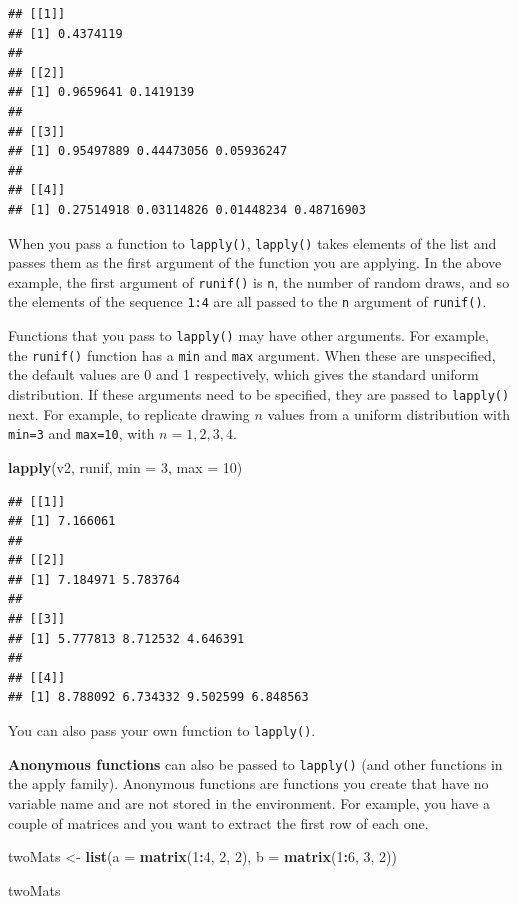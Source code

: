 \documentclass[
]{book}
\newenvironment{Shaded}{\begin{snugshade}}{\end{snugshade}}
\newcommand{\AttributeTok}[1]{\textcolor[rgb]{0.13,0.29,0.53}{#1}}
\newcommand{\DecValTok}[1]{\textcolor[rgb]{0.00,0.00,0.81}{#1}}
\newcommand{\FunctionTok}[1]{\textcolor[rgb]{0.13,0.29,0.53}{\textbf{#1}}}
\newcommand{\NormalTok}[1]{#1}
\newcommand{\OtherTok}[1]{\textcolor[rgb]{0.56,0.35,0.01}{#1}}
\newcommand{\SpecialCharTok}[1]{\textcolor[rgb]{0.81,0.36,0.00}{\textbf{#1}}}
\theoremstyle{definition}
\theoremstyle{definition}
\theoremstyle{definition}
\theoremstyle{definition}
\theoremstyle{remark}
\begin{document}
\begin{verbatim}
## [[1]]
## [1] 0.4374119
## 
## [[2]]
## [1] 0.9659641 0.1419139
## 
## [[3]]
## [1] 0.95497889 0.44473056 0.05936247
## 
## [[4]]
## [1] 0.27514918 0.03114826 0.01448234 0.48716903
\end{verbatim}

When you pass a function to \texttt{lapply()}, \texttt{lapply()} takes elements of the list and passes them as the first argument of the function you are applying. In the above example, the first argument of \texttt{runif()} is \texttt{n}, the number of random draws, and so the elements of the sequence \texttt{1:4} are all passed to the \texttt{n} argument of \texttt{runif()}.

Functions that you pass to \texttt{lapply()} may have other arguments. For example, the \texttt{runif()} function has a \texttt{min} and \texttt{max} argument. When these are unspecified, the default values are 0 and 1 respectively, which gives the standard uniform distribution. If these arguments need to be specified, they are passed to \texttt{lapply()} next. For example, to replicate drawing \(n\) values from a uniform distribution with \texttt{min=3} and \texttt{max=10}, with \(n = 1, 2, 3, 4\).

\begin{Shaded}
\begin{Highlighting}[]
\FunctionTok{lapply}\NormalTok{(v2, runif, }\AttributeTok{min =} \DecValTok{3}\NormalTok{, }\AttributeTok{max =} \DecValTok{10}\NormalTok{)}
\end{Highlighting}
\end{Shaded}

\begin{verbatim}
## [[1]]
## [1] 7.166061
## 
## [[2]]
## [1] 7.184971 5.783764
## 
## [[3]]
## [1] 5.777813 8.712532 4.646391
## 
## [[4]]
## [1] 8.788092 6.734332 9.502599 6.848563
\end{verbatim}

You can also pass your own function to \texttt{lapply()}.

\textbf{Anonymous functions} can also be passed to \texttt{lapply()} (and other functions in the apply family). Anonymous functions are functions you create that have no variable name and are not stored in the environment. For example, you have a couple of matrices and you want to extract the first row of each one.

\begin{Shaded}
\begin{Highlighting}[]
\NormalTok{twoMats }\OtherTok{\textless{}{-}} \FunctionTok{list}\NormalTok{(}\AttributeTok{a =} \FunctionTok{matrix}\NormalTok{(}\DecValTok{1}\SpecialCharTok{:}\DecValTok{4}\NormalTok{, }\DecValTok{2}\NormalTok{, }\DecValTok{2}\NormalTok{), }\AttributeTok{b =} \FunctionTok{matrix}\NormalTok{(}\DecValTok{1}\SpecialCharTok{:}\DecValTok{6}\NormalTok{, }\DecValTok{3}\NormalTok{, }\DecValTok{2}\NormalTok{))}

\NormalTok{twoMats}
\end{Highlighting}
\end{Shaded}
\end{document}
